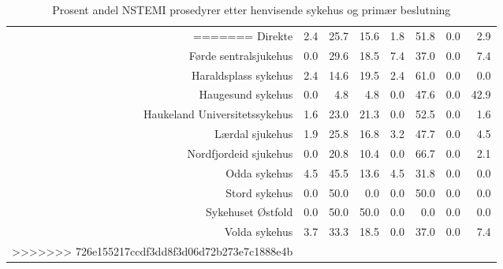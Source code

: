 \documentclass[presentation,xcolor=pdftex,dvipsnames,table]{beamer}
\begin{document}
\begin{frame}
\begin{tiny}
\begin{table}[ht]
\begin{tabular}{rrrrrrrr}
=======
Direkte & 2.4 & 25.7 & 15.6 & 1.8 & 51.8 & 0.0 & 2.9 \\ 
  Førde sentralsjukehus & 0.0 & 29.6 & 18.5 & 7.4 & 37.0 & 0.0 & 7.4 \\ 
  Haraldsplass sykehus & 2.4 & 14.6 & 19.5 & 2.4 & 61.0 & 0.0 & 0.0 \\ 
  Haugesund sykehus & 0.0 & 4.8 & 4.8 & 0.0 & 47.6 & 0.0 & 42.9 \\ 
  Haukeland Universitetssykehus & 1.6 & 23.0 & 21.3 & 0.0 & 52.5 & 0.0 & 1.6 \\ 
  Lærdal sjukehus & 1.9 & 25.8 & 16.8 & 3.2 & 47.7 & 0.0 & 4.5 \\ 
  Nordfjordeid sjukehus & 0.0 & 20.8 & 10.4 & 0.0 & 66.7 & 0.0 & 2.1 \\ 
  Odda sykehus & 4.5 & 45.5 & 13.6 & 4.5 & 31.8 & 0.0 & 0.0 \\ 
  Stord sykehus & 0.0 & 50.0 & 0.0 & 0.0 & 50.0 & 0.0 & 0.0 \\ 
  Sykehuset Østfold & 0.0 & 50.0 & 50.0 & 0.0 & 0.0 & 0.0 & 0.0 \\ 
  Volda sykehus & 3.7 & 33.3 & 18.5 & 0.0 & 37.0 & 0.0 & 7.4 \\ 
>>>>>>> 726e155217ccdf3dd8f3d06d72b273e7c1888e4b
   \bottomrule
\end{tabular}
\caption{Prosent andel NSTEMI prosedyrer etter henvisende sykehus og primær beslutning} 
\end{table}\end{tiny}
\end{frame}
\end{document}
